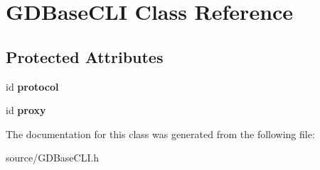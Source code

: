 \hypertarget{interface_g_d_base_c_l_i}{
\section{GDBaseCLI Class Reference}
\label{interface_g_d_base_c_l_i}
}
\subsection*{Protected Attributes}
\begin{DoxyCompactItemize}
\item 
\hypertarget{interface_g_d_base_c_l_i_a3fb64c391f172bc9ac4b044ac24364a1}{
id {\bfseries protocol}}
\label{interface_g_d_base_c_l_i_a3fb64c391f172bc9ac4b044ac24364a1}

\item 
\hypertarget{interface_g_d_base_c_l_i_a7048db09b852bf9e507a424b1a2943c0}{
id {\bfseries proxy}}
\label{interface_g_d_base_c_l_i_a7048db09b852bf9e507a424b1a2943c0}

\end{DoxyCompactItemize}


The documentation for this class was generated from the following file:\begin{DoxyCompactItemize}
\item 
source/GDBaseCLI.h\end{DoxyCompactItemize}
